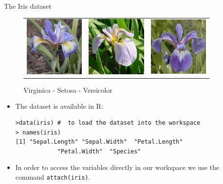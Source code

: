 \documentclass[handout]{beamer}
\begin{document}
\begin{frame}[fragile]{The Iris dataset}
\scriptsize{


 \begin{figure}[h!]
\begin{center}
\begin{tabular}{ccc}
 \includegraphics[width=3cm]{pics/virginica.jpg}
&
\includegraphics[width=3cm]{pics/setosa.jpg}
&
\includegraphics[width=3cm]{pics/versicolor.jpg}
\end{tabular}
\caption{Virginica - Setosa - Versicolor}
\end{center}
\end{figure}

\begin{itemize}
 \item The dataset is available in R:
 \begin{verbatim}
>data(iris) #  to load the dataset into the workspace
> names(iris)
[1] "Sepal.Length" "Sepal.Width"  "Petal.Length" 
		    "Petal.Width"  "Species"     
 \end{verbatim}

 \item In order to access the variables directly in our workspace we use the command \verb+attach(iris)+.
 
 
\end{itemize}



}

\end{frame}
\end{document}
